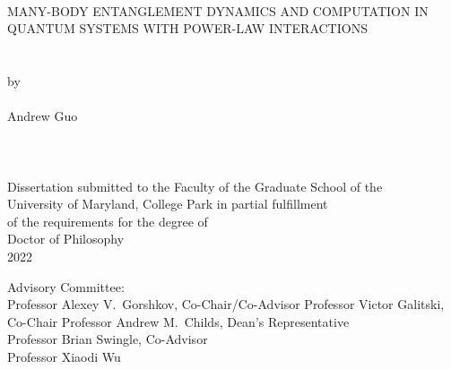 \hbox{\ }
\vspace{1in}
\begin{center}

\large{{MANY-BODY ENTANGLEMENT DYNAMICS AND COMPUTATION IN QUANTUM SYSTEMS WITH POWER-LAW INTERACTIONS}}\\
\ \\
\ \\
\large{by} \\
\ \\
\large{Andrew Guo}%
\ \\
\ \\
\ \\
\ \\
\normalsize
Dissertation submitted to the Faculty of the Graduate School of the \\
University of Maryland, College Park in partial fulfillment \\
of the requirements for the degree of \\
Doctor of Philosophy \\
2022
\end{center}

\vspace{7.5em}

\noindent Advisory Committee: \\
Professor Alexey V.\ Gorshkov, Co-Chair/Co-Advisor
Professor Victor Galitski, Co-Chair
Professor Andrew M.\ Childs, Dean's Representative \\
Professor Brian Swingle, Co-Advisor\\
Professor Xiaodi Wu

